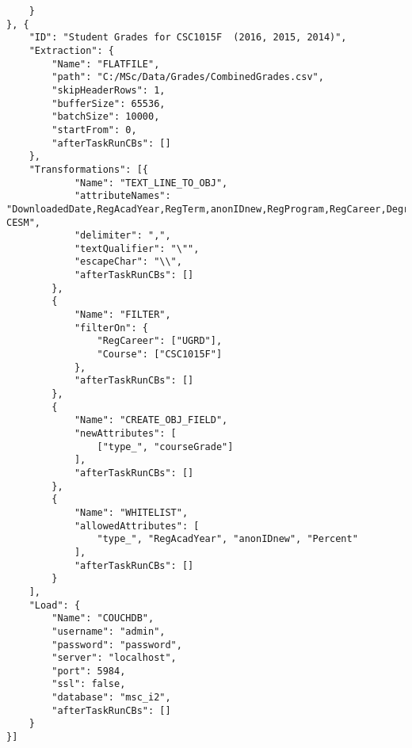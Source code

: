 \begin{verbatim}
    }
}, {
    "ID": "Student Grades for CSC1015F  (2016, 2015, 2014)",
    "Extraction": {
        "Name": "FLATFILE",
        "path": "C:/MSc/Data/Grades/CombinedGrades.csv",
        "skipHeaderRows": 1,
        "bufferSize": 65536,
        "batchSize": 10000,
        "startFrom": 0,
        "afterTaskRunCBs": []
    },
    "Transformations": [{
            "Name": "TEXT_LINE_TO_OBJ",
            "attributeNames": "DownloadedDate,RegAcadYear,RegTerm,anonIDnew,RegProgram,RegCareer,Degree,DegreeDescr,Subject,Catalog.,Course,CourseSuffix,Session,Percent,Symbol,UnitsTaken,CourseID,CourseDescr,CourseCareer,Faculty,Dept,MaximumCrseUnits,CourseCount,CourseLevel,CESM,Sub-CESM",
            "delimiter": ",",
            "textQualifier": "\"",
            "escapeChar": "\\",
            "afterTaskRunCBs": []
        },
        {
            "Name": "FILTER",
            "filterOn": {
                "RegCareer": ["UGRD"],
                "Course": ["CSC1015F"]
            },
            "afterTaskRunCBs": []
        },
        {
            "Name": "CREATE_OBJ_FIELD",
            "newAttributes": [
                ["type_", "courseGrade"]
            ],
            "afterTaskRunCBs": []
        },
        {
            "Name": "WHITELIST",
            "allowedAttributes": [
                "type_", "RegAcadYear", "anonIDnew", "Percent"
            ],
            "afterTaskRunCBs": []
        }
    ],
    "Load": {
        "Name": "COUCHDB",
        "username": "admin",
        "password": "password",
        "server": "localhost",
        "port": 5984,
        "ssl": false,
        "database": "msc_i2",
        "afterTaskRunCBs": []
    }
}]
\end{verbatim}